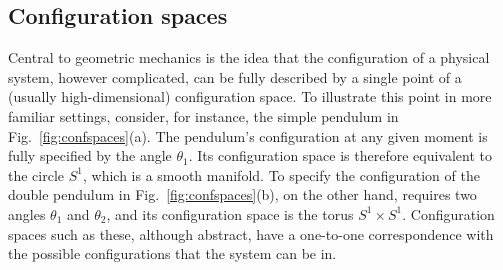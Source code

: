 \subsection{Configuration spaces}

Central to geometric mechanics is the idea that the configuration of a physical system, however complicated, can be fully described by a single point of a (usually high-dimensional) configuration space.
To illustrate this point in more familiar settings, consider, for instance, the simple pendulum in Fig.~\ref{fig:confspaces}(a).
The pendulum's configuration at any given moment is fully specified by the angle $\theta_{1}$.
Its configuration space is therefore equivalent to the circle $S^{1}$, which is a smooth manifold.
To specify the configuration of the double pendulum in Fig.~\ref{fig:confspaces}(b), on the other hand, requires two angles $\theta_{1}$ and $\theta_{2}$, and its configuration space is the torus $S^{1}\times S^{1}$.
Configuration spaces such as these, although abstract, have a one-to-one correspondence with the possible configurations that the system can be in.

